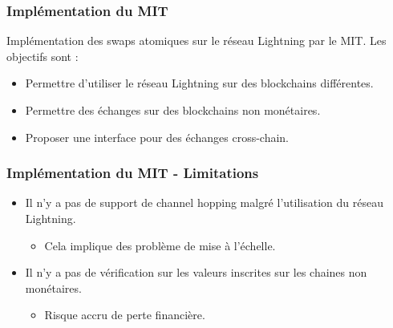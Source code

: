 \begin{frame}
	\frametitle{Implémentation du MIT}
	Implémentation des swaps atomiques sur le réseau Lightning par le MIT. Les objectifs sont :
	\newline
	\begin{itemize}
		\item Permettre d'utiliser le réseau Lightning sur des blockchains différentes.
		\item Permettre des échanges sur des blockchains non monétaires.
		\item Proposer une interface pour des échanges cross-chain.
	\end{itemize}

\end{frame}


\begin{frame}
	\frametitle{Implémentation du MIT - Limitations}


	\begin{itemize}
		\item Il n'y a pas de support de channel hopping malgré l'utilisation du réseau Lightning.
		      \begin{itemize}
			      \item Cela implique des problème de mise à l'échelle.
		      \end{itemize}
		\item Il n'y a pas de vérification sur les valeurs inscrites sur les chaines non monétaires.
		\begin{itemize}
			\item Risque accru de perte financière.
		\end{itemize}
	\end{itemize}
\end{frame}
